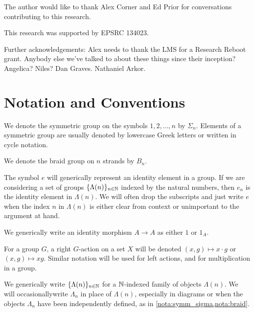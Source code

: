 The author would like to thank Alex Corner and Ed Prior for conversations contributing to this research.

This research was supported by EPSRC 134023.

Further acknowledgements:
Alex needs to thank the LMS for a Research Reboot grant. Anybody else we've talked to about these things since their inception? Angelica? Niles? Dan Graves. Nathaniel Arkor.




\section{Notation and Conventions}\label{sec:notation}

\begin{nota}\label{nota:symm_sigma}
We denote the symmetric group on the symbols $1, 2, \ldots, n$ by $\Sigma_n$. Elements of a symmetric group are usually denoted by lowercase Greek letters or written in cycle notation.
\end{nota}

\begin{nota}\label{nota:braid}
We denote the braid group on $n$ strands by $B_n$.
\end{nota}

\begin{nota}\label{nota:e_identity}
The symbol $e$ will generically represent an identity element in a group. If we are considering a set of groups $\{ \Lambda(n) \}_{n \in \mathbb{N}}$ indexed by the natural numbers, then $e_{n}$ is the identity element in $\Lambda(n)$. We will often drop the subscripts and just write $e$ when the index $n$ in $\Lambda(n)$ is either clear from context or unimportant to the argument at hand.
\end{nota}

\begin{conv}\label{conv:1_id}
We generically write an identity morphism $A \to A$ as either $1$ or $1_A$.
\end{conv}

\begin{nota}\label{nota:g-action}
For a group $G$, a right $G$-action on a set $X$ will be denoted $(x,g) \mapsto x \cdot g$ or $(x,g) \mapsto x g$. 
Similar notation will be used for left actions, and for multiplication in a group.
\end{nota}

\begin{conv}\label{conv:indexed}
We generically write $\{ \Lambda(n) \}_{n \in \mathbb{N}}$ for a $\mathbb{N}$-indexed family of objects $\Lambda(n)$. We will occasionallywrite $\Lambda_n$ in place of $\Lambda(n)$, especially in diagrams or when the objects $\Lambda_n$ have been independently defined, as in \cref{nota:symm_sigma,nota:braid}.
\end{conv}

